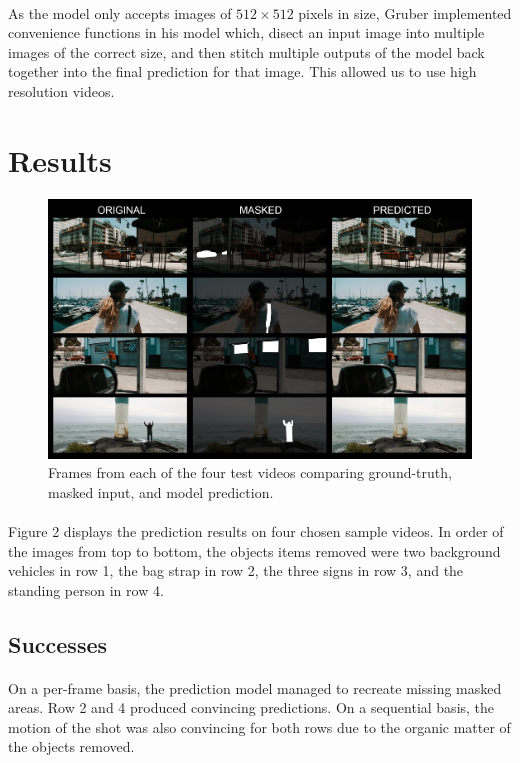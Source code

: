 \documentclass{article}
\begin{document}
\paragraph{}
As the model only accepts images of $512 \times 512$ pixels in size, Gruber implemented convenience functions in his model which, disect an input image into multiple images of the correct size, and then stitch multiple outputs of the model back together into the final prediction for that image. This allowed us to use high resolution videos.


\pagebreak
\section{Results}

\begin{figure}[ht]
  \centering
  \includegraphics[scale=0.16]{results.jpg}
  \caption{Frames from each of the four test videos comparing ground-truth, masked input, and model prediction.}
\end{figure}

\paragraph{}
Figure 2 displays the prediction results on four chosen sample videos. In order of the images from top to bottom, the objects items removed were two background vehicles in row 1, the bag strap in row 2, the three signs in row 3, and the standing person in row 4.


\subsection{Successes}
\paragraph{}
On a per-frame basis, the prediction model managed to recreate missing masked areas. Row 2 and 4 produced convincing predictions. On a sequential basis, the motion of the shot was also convincing for both rows due to the organic matter of the objects removed.
\end{document}

